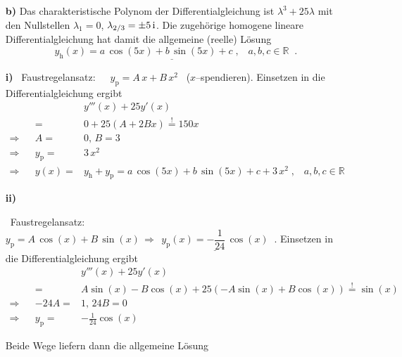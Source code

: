 {\begin{enumerate}
F\"ur\ \ $r=14\,\EH{3x}$\ \ ergibt sich nach ii) : \ \ \ $\underline{\;y_{\text{p}_{2}}(x)=14x\,\EH{3x}\;}\;.$

Allgemeine L\"osung: \ \ \ $\underline{\;y(x)=y_{\text{h}}+y_{\text{p}_{1}}+y_{\text{p}_{2}} = a\,\EH{2x}+b\,\EH{3x}+3+14x\,\EH{3x}\;,\;\;a,b\in \mathbb{R}\;}\;.$


\item[\textbf{b)}]  Das charakteristische Polynom der Differentialgleichung ist $\lambda^3+25\lambda$ mit den Nullstellen $\lambda_1=0$, $\lambda_{2/3}=\pm 5\,\mathrm{i}$. Die zugeh\"orige homogene lineare Differentialgleichung hat damit die allgemeine (reelle) L\"osung 
\[
\underline{\;y_{\text{h}}(x)=a\,\cos (5x)+b\,\sin (5x)+c\;,\;\;\;a,b,c\in \mathbb{R}\;}\;. 
\]

\textbf{i)} \ Faustregelansatz:\ \ \ $y_{\text{p}}=A\,x+B\,x^{2}$ \ (\glqq$x$--spendieren\grqq). Einsetzen in die Differentialgleichung ergibt
\begin{align*}
&&&y'''(x)+25y'(x)\\
&&=& 0 + 25(A+2Bx) \overset!= 150 x\\
\Rightarrow && A=&0,\, B=3\\
\Rightarrow&& y_{\text{p}}=&3\,x^{2}\\
\Rightarrow&& y(x)=& y_{\text{h}}+y_{\text{p}} = 
a\,\cos(5x)+b\,\sin(5x)+c+3\,x^{2}\;,\;\;\;a,b,c\in \mathbb{R}
\end{align*}

\textbf{ii)} 
% 
% 
% 
% 
% 

\ Faustregelansatz:\ \ \ $y_{\text{p}}=A\,\cos(x)+B\,\sin(x) \,\Rightarrow\,  \underline{\;y_{\text{p}}(x)=-\dfrac{1}{24}\,\cos (x)\;}\;.$
Einsetzen in die Differentialgleichung ergibt
\begin{align*}
&&&y'''(x)+25y'(x)\\
&&=& A\sin(x) -B\cos(x) + 25(-A\sin(x)+B\cos(x)) \overset!= \sin(x)\\
\Rightarrow && -24A=&1,\, 24B=0\\
\Rightarrow&& y_{\text{p}}=&-\frac 1{24}\cos(x)
\end{align*}

Beide Wege liefern dann die allgemeine L\"osung


\end{enumerate}}
